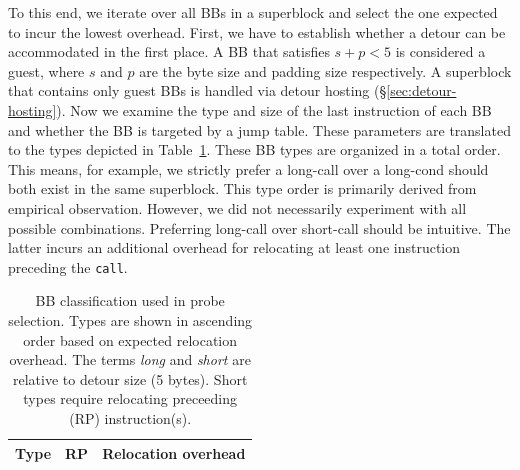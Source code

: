 {To this end, we iterate over all BBs in a superblock and select the one expected to incur the lowest overhead.
First, we have to establish whether a detour can be accommodated in the first place.
A BB that satisfies $s + p < 5 $ is considered a \textsf{guest}, where $s$ and $p$ are the byte size and padding size respectively.
A superblock that contains only \textsf{guest} BBs is handled via detour hosting (\S\ref{sec:detour-hosting}).
Now we examine the type and size of the last instruction of each BB and whether the BB is targeted by a jump table.
These parameters are translated to the types depicted in Table~\ref{tab:probe-overhead}.
These BB types are organized in a total order.
This means, for example, we strictly prefer a \textsf{long-call} over a \textsf{long-cond} should both exist in the same superblock.
This type order is primarily derived from empirical observation.
However, we did not necessarily experiment with all possible combinations.
Preferring \textsf{long-call} over \textsf{short-call} should be intuitive.
The latter incurs an additional overhead for relocating at least one instruction preceding the \texttt{call}.

\begin{table}[t!]
    \centering
    \renewcommand{\arraystretch}{1.2}
    \setlength\tabcolsep{4pt}
    \small
    \caption{BB classification used in probe selection. Types are shown in ascending order based on expected relocation overhead. 
    The terms \textit{long} and \textit{short }are relative to detour size (5 bytes).
    Short types require relocating preceeding (RP) instruction(s).
    } 
    \label{tab:probe-overhead}    
    \begin{tabularx}{\columnwidth}{@{}lll@{}}
        \\
        \textbf{Type} &
        \textbf{RP} &
        \textbf{Relocation overhead} \\
        
        \toprule
        

\end{tabularx}
\end{table}}
